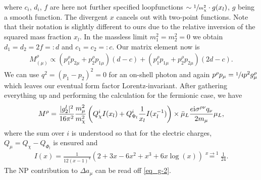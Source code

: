 where $c_i$, $d_i$, $f$ are here not further specified loopfunctions $\sim \sfrac{1}{m^2_\chi} \cdot g(x_l)$, $g$ being a smooth function. The divergent $x$
cancels out with two-point functions. Note that their notation is slightly different to ours due to the relative inversion of the squared mass 
fraction $x_l$. In the massless limit $m_1^2 = m_2^2 = 0$ we obtain $d_1 = d_2 = 2f =: d$ and $c_1 = c_2 =: c$. Our matrix element now is
\begin{align}
 M^\rho_{(\mu)} \propto (p_1^\rho p_{2\mu} + p_2^\rho p_{1\mu}) (d-c) + (p_1^\rho p_{1\mu} + p_2^\rho p_{2\mu}) (2d-c).
\end{align}
We can use $q^2 = (p_1-p_2)^2 = 0$ for an on-shell photon and again $p^\rho p_\mu = \sfrac{1}{4} p^2 g^\rho_\mu $ which leaves our eventual form factor 
Lorentz-invariant. After gathering everything up and performing the calculation for the fermionic case, we have
\begin{align}
 M^\rho = \frac{|g^l_2|^2}{16\pi^2} \frac{m^2_\mu}{m_\chi^2}\left(Q_\chi^i I(x_l) + Q_{\Phi_l}^i \frac{1}{x_l} I(x_l^{-1}) \right)\times \bar \mu_L\frac{e\text{i}\sigma^{\rho\nu}q_\nu}{2m_\mu} \mu_L,
 \label{eq_g-2}
\end{align}
where the sum over $i$ is understood so that for the electric charges, $Q_\mu = Q_\chi - Q_{\Phi_l}$ is ensured and
\begin{align}
 I(x) = \frac{1}{12(x-1)^4}\left(2+3x-6x^2+x^3+6x\log(x) \right) \stackrel{x\rightarrow1}{=} \frac{1}{24}.
\end{align}
The NP contribution to $\Delta a_\mu$ can be read off \eqref{eq_g-2}.
